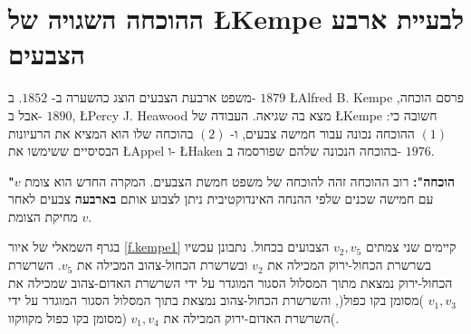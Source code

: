 
\section{ההוכחה השגויה של
\L{Kempe}
לבעיית ארבע הצבעים}
\label{s.kempe}

משפט ארבעת הצבעים הוצג כהשערה ב-%
$1852$.
ב-%
$1879$
\L{Alfred B. Kempe}
פרסם הוכחה, אבל ב-%
$1890$,
\L{Percy J. Heawood}
מצא בה שגיאה. העבודה של
\L{Kempe}
חשובה כי: 
$(1)$
ההוכחה נכונה עבור חמישה צבעים, ו-%
$(2)$
בהוכחה שלו הוא המציא את הרעיונות הבסיסיים ששימשו את
\L{Appel}
ו-%
\L{Haken}
בהוכחה הנכונה שלהם שפורסמה ב-%
$1976$.

\textbf{"הוכחה":}
רוב ההוכחה זהה להוכחה של משפט חמשת הצבעים. המקרה החדש הוא צומת 
$v$
עם חמישה שכנים שלפי ההנחה האינדוקטיבית ניתן לצבוע אותם
\textbf{בארבעה}
צבעים לאחר מחיקת הצומת
$v$.

בגרף השמאלי של איור %
\ref{f.kempe1}
קיימים שני צמתים
$v_2,v_5$
הצבועים בכחול. נתבונן עכשיו בשרשרת הכחול-ירוק המכילה את 
$v_2$
ובשרשרת הכחול-צהוב המכילה את
$v_5$.
השרשרת הכחול-ירוק נמצאת מתוך המסלול הסגור המוגדר על ידי השרשרת האדום-צהוב שמכילה את
$v_1,v_3$
)מסומן בקו כפול(,
והשרשרת הכחול-צהוב נמצאת בתוך המסלול הסגור המוגדר על ידי השרשרת האדום-ירוק המכילה את
$v_1,v_4$
(מסומן בקו כפול מקווקוו(.

